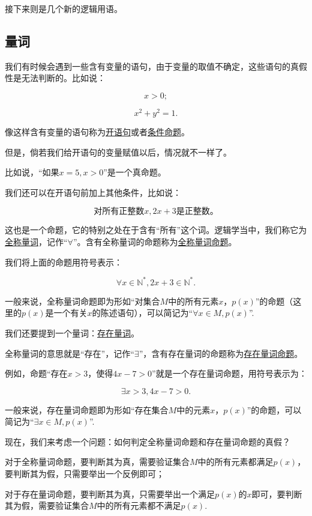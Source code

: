 \documentclass[lang=cn,math=cm,chinesefont=nofont,11pt,scheme=chinese,onecol]{elegantbook}
\begin{document}
接下来则是几个新的逻辑用语。

\subsection{量词}

我们有时候会遇到一些含有变量的语句，由于变量的取值不确定，这些语句的真假性是无法判断的。比如说：

$$x>0;$$

$$x^2+y^2=1.$$

像这样含有变量的语句称为\underline{开语句}或者\underline{条件命题}。

但是，倘若我们给开语句的变量赋值以后，情况就不一样了。

比如说，“如果$x=5,x>0$”是一个真命题。

我们还可以在开语句前加上其他条件，比如说：

$$\text{对所有正整数}x,2x+3\text{是正整数。}$$

这也是一个命题，它的特别之处在于含有“所有”这个词。逻辑学当中，我们称它为\underline{全称量词}，记作“$\forall$”。含有全称量词的命题称为\underline{全称量词命题}。

我们将上面的命题用符号表示：

$$\forall x\in\mathbb{N}^*,2x+3\in\mathbb{N}^*.$$

一般来说，全称量词命题即为形如“对集合$M$中的所有元素$x$，$p(x)$”的命题（这里的$p(x)$是一个有关$x$的陈述语句），可以简记为“$\forall x\in M,p(x)$”.

\hspace*{\fill}

我们还要提到一个量词：\underline{存在量词}。

全称量词的意思就是“存在”，记作“$\exists$”，含有存在量词的命题称为\underline{存在量词命题}。

例如，命题“存在$x>3$，使得$4x-7>0$”就是一个存在量词命题，用符号表示为：

$$\exists x>3,4x-7>0.$$

一般来说，存在量词命题即为形如“存在集合$M$中的元素$x$，$p(x)$”的命题，可以简记为“$\exists x\in M,p(x)$”.

现在，我们来考虑一个问题：如何判定全称量词命题和存在量词命题的真假？

对于全称量词命题，要判断其为真，需要验证集合$M$中的所有元素都满足$p(x)$，要判断其为假，只需要举出一个反例即可；

对于存在量词命题，要判断其为真，只需要举出一个满足$p(x)$的$x$即可，要判断其为假，需要验证集合$M$中的所有元素都不满足$p(x)$.
\end{document}
